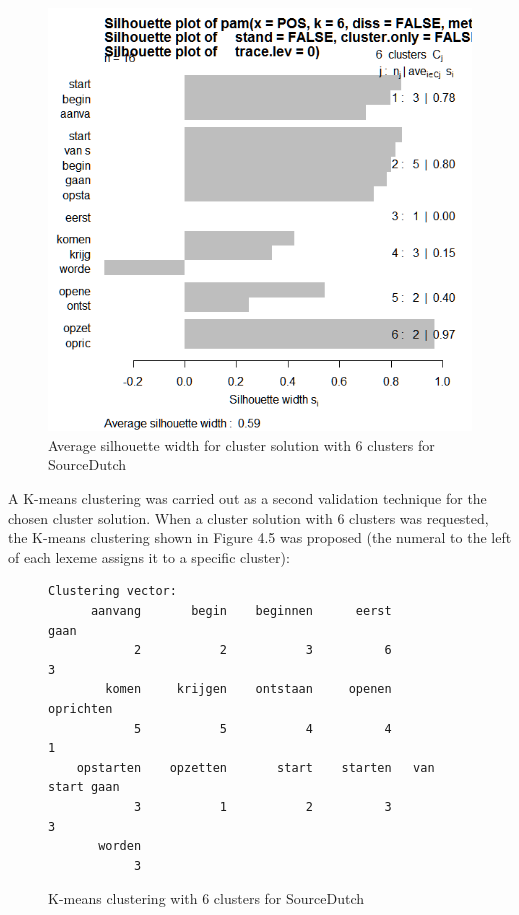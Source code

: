 \begin{figure}
\includegraphics[height=.4\textheight]{figures/Vandevoorde2-img53.png}
\caption{\label{fig:4:53}  Average silhouette width for cluster solution with 6 clusters for SourceDutch}
\end{figure}

A K-means clustering was carried out as a second validation technique for the chosen cluster solution. When a cluster solution with 6 clusters was requested, the K-means clustering shown in Figure 4.5 was proposed (the numeral to the left of each lexeme assigns it to a specific cluster):
  
\begin{figure}
\footnotesize
\begin{lstlisting}
Clustering vector:
      aanvang       begin    beginnen      eerst             gaan 
            2           2           3          6                3         
        komen     krijgen    ontstaan     openen        oprichten         
            5           5           4          4                1         
    opstarten    opzetten       start    starten   van start gaan         
            3           1           2          3                3         
       worden                                            
            3                                      
\end{lstlisting}     

\caption{\label{fig:4:54}  K-means clustering with 6 clusters for SourceDutch}
\end{figure}

